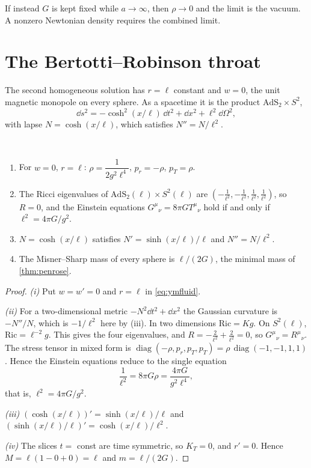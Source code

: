 If instead $G$ is kept fixed while $a\to\infty$, then $\rho\to0$ and the limit is the vacuum. A nonzero Newtonian density requires the combined limit.

\section{The Bertotti--Robinson throat}

The second homogeneous solution has $r=\ell$ constant and $w=0$, the unit magnetic monopole on every sphere. As a spacetime it is the product $\mathrm{AdS}_2\times S^2$,
\[
\dd s^2=-\cosh^2(x/\ell)\,\dd t^2+\dd x^2+\ell^2\dd\Omega^2,
\]
with lapse $N=\cosh(x/\ell)$, which satisfies $N''=N/\ell^2$.

\begin{theorem}\label{thm:br}\ver\
\begin{enumerate}[label=(\roman*)]
\item For $w=0$, $r=\ell$: $\rho=\dfrac1{2g^2\ell^4}$, $p_r=-\rho$, $p_T=\rho$.
\item The Ricci eigenvalues of $\mathrm{AdS}_2(\ell)\times S^2(\ell)$ are $(-\frac1{\ell^2},-\frac1{\ell^2},\frac1{\ell^2},\frac1{\ell^2})$, so $R=0$, and the Einstein equations $G^\mu{}_\nu=8\pi GT^\mu{}_\nu$ hold if and only if $\ell^2=4\pi G/g^2$.
\item $N=\cosh(x/\ell)$ satisfies $N'=\sinh(x/\ell)/\ell$ and $N''=N/\ell^2$.
\item The Misner--Sharp mass of every sphere is $\ell/(2G)$, the minimal mass of \cref{thm:penrose}.
\end{enumerate}
\end{theorem}
\begin{proof}
\emph{(i)} Put $w=w'=0$ and $r=\ell$ in \eqref{eq:ymfluid}.

\emph{(ii)} For a two-dimensional metric $-N^2\dd t^2+\dd x^2$ the Gaussian curvature is $-N''/N$, which is $-1/\ell^2$ here by (iii). In two dimensions $\mathrm{Ric}=Kg$. On $S^2(\ell)$, $\mathrm{Ric}=\ell^{-2}g$. This gives the four eigenvalues, and $R=-\frac2{\ell^2}+\frac2{\ell^2}=0$, so $G^\mu{}_\nu=R^\mu{}_\nu$. The stress tensor in mixed form is $\operatorname{diag}(-\rho,p_r,p_T,p_T)=\rho\,\operatorname{diag}(-1,-1,1,1)$. Hence the Einstein equations reduce to the single equation
\[
\frac1{\ell^2}=8\pi G\rho=\frac{4\pi G}{g^2\ell^4},
\]
that is, $\ell^2=4\pi G/g^2$.

\emph{(iii)} $(\cosh(x/\ell))'=\sinh(x/\ell)/\ell$ and $(\sinh(x/\ell)/\ell)'=\cosh(x/\ell)/\ell^2$.

\emph{(iv)} The slices $t=$ const are time symmetric, so $K_T=0$, and $r'=0$. Hence $M=\ell(1-0+0)=\ell$ and $m=\ell/(2G)$.
\end{proof}


